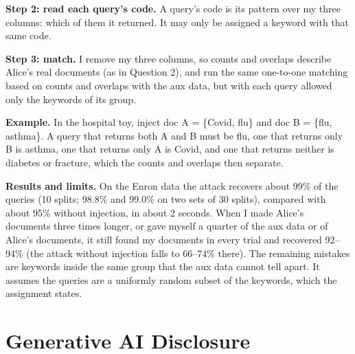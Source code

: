 \documentclass[12pt]{article}
\begin{document}
\begin{answer}
    \textbf{Step 2: read each query's code.}
    A query's code is its pattern over my three columns: which of them it returned.
    It may only be assigned a keyword with that same code.

    \textbf{Step 3: match.}
    I remove my three columns, so counts and overlaps describe Alice's real documents (as in Question 2), and run the same one-to-one matching based on counts and overlaps with the aux data, but with each query allowed only the keywords of its group.

    \textbf{Example.}
    In the hospital toy, inject doc A = \{Covid, flu\} and doc B = \{flu, asthma\}.
    A query that returns both A and B must be flu, one that returns only B is asthma, one that returns only A is Covid, and one that returns neither is diabetes or fracture, which the counts and overlaps then separate.

    \textbf{Results and limits.}
    On the Enron data the attack recovers about 99\% of the queries (10 splits; 98.8\% and 99.0\% on two sets of 30 splits), compared with about 95\% without injection, in about 2 seconds.
    When I made Alice's documents three times longer, or gave myself a quarter of the aux data or of Alice's documents, it still found my documents in every trial and recovered 92--94\% (the attack without injection falls to 66--74\% there).
    The remaining mistakes are keywords inside the same group that the aux data cannot tell apart.
    It assumes the queries are a uniformly random subset of the keywords, which the assignment states.
\end{answer}

\section*{Generative AI Disclosure}

\end{document}

